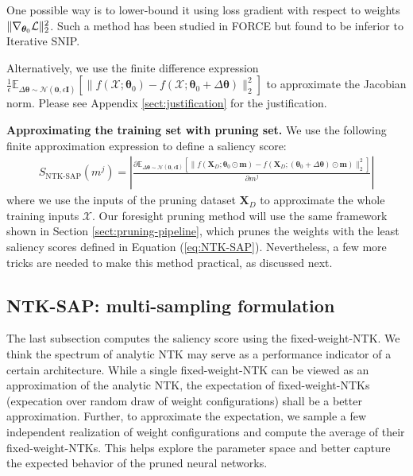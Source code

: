 \documentclass{article} %
\begin{document}
One possible way is to lower-bound it using loss gradient with respect to weights $\|\nabla_{\boldsymbol{\theta}_0}\mathcal{L}\|_{2}^2$. Such a method has been studied in FORCE \citep{force} but found to be inferior to Iterative SNIP.

Alternatively, we use the finite difference expression $\frac{1}{\epsilon}\mathbb{E}_{\Delta \boldsymbol{\theta} \sim \mathcal{N}(\textbf{0},\epsilon\textbf{I})}\left[\|f(\mathcal{X};\boldsymbol{\theta}_0)-f(\mathcal{X};\boldsymbol{\theta}_0+\Delta\boldsymbol{\theta})\|_2^2\right]$ to approximate the Jacobian norm. Please see Appendix \ref{sect:justification} for the justification.

\textbf{Approximating the training set with pruning set.} We use the following finite approximation expression to define a saliency score:
\begin{align}
\label{eq:NTK-SAP}
    S_{\text{NTK-SAP}}(m^j)
= \left|\frac{\partial \mathbb{E}_{\Delta \boldsymbol{\theta} \sim \mathcal{N}(\textbf{0},\epsilon\textbf{I})}\left[\|f(\mathbf{X}_D;\boldsymbol{\theta}_0\odot \textbf{m})-f(\mathbf{X}_D;(\boldsymbol{\theta}_0+\Delta\boldsymbol{\theta})\odot \textbf{m})\|_2^2\right]}{\partial m^j}\right|
\end{align}
where we use the inputs of the pruning dataset $\mathbf{X}_D$ to approximate the whole training inputs $\mathcal{X}$. Our foresight pruning method will use the same framework shown in Section \ref{sect:pruning-pipeline}, which prunes the weights with the least saliency scores defined in Equation (\ref{eq:NTK-SAP}). Nevertheless, a few more tricks are needed to make this method practical, as discussed next.

\subsection{NTK-SAP: multi-sampling formulation} \label{sect:mult-sample-formulation}

The last subsection computes the saliency score using the fixed-weight-NTK.
We think the spectrum of analytic NTK may serve as a performance indicator of a certain architecture.  While a single fixed-weight-NTK can be viewed as an approximation
of the analytic NTK,  the expectation of fixed-weight-NTKs (expecation over random draw of weight configurations) shall be a better approximation. Further, to approximate the expectation, we sample a few independent realization of weight configurations and compute the average of their fixed-weight-NTKs. This helps explore the parameter space and better capture the expected behavior of the pruned neural networks. 
\end{document}
